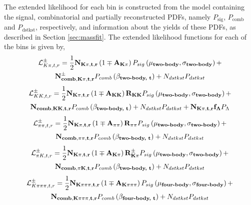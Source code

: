 The extended likelihood for each bin is constructed from the model containing the signal, combinatorial and partially reconstructed PDFs, namely $P_{\text{sig}}$, $P_{\text{comb}}$ and $P_{\text{dstkst}}$, respectively, and information about the yields of these PDFs, as described in Section \ref{sec:massfit}. The extended likelihood functions for each of the bins is given by,
\begin{multline}
\mathcal{L}_{K\pi, t, r}^{\pm} = \frac{1}{2}\mathbf{N_{K\pi, t, r}}\left(1 \mp \mathbf{A_{K\pi}}\right)P_{sig}\left(\mathbf{\mu_\text{\textbf{two-body}}},\mathbf{\sigma_\text{\textbf{two-body}}}\right) + \\ \mathbf{N_{comb, K\pi, t, r}^{\pm}}P_{comb}\left(\mathbf{\beta_\text{\textbf{two-body, t}}}\right) + N_{dstkst}P_{dstkst}
\label{kpilikelihood}
\end{multline}
\begin{multline}
\mathcal{L}_{KK, t, r}^{\pm} = \frac{1}{2}\mathbf{N_{K\pi, t, r}}\left(1 \mp \mathbf{A_{KK}}\right)\mathbf{R_{KK}} P_{sig}\left(\mathbf{\mu_\text{\textbf{two-body}}},\mathbf{\sigma_\text{\textbf{two-body}}}\right) + \\ \mathbf{N_{comb, KK, t, r}}P_{comb}\left(\mathbf{\beta_\text{\textbf{two-body, t}}}\right) + N_{dstkst}P_{dstkst} + \mathbf{N_{K\pi, t, r}}\mathbf{f_{\Lambda}}P_{\Lambda}
\end{multline}
\begin{multline}
\mathcal{L}_{\pi\pi, t, r}^{\pm} = \frac{1}{2}\mathbf{N_{K\pi, t, r}}\left(1 \mp \mathbf{A_{\pi\pi}}\right)\mathbf{R_{\pi\pi}} P_{sig}\left(\mathbf{\mu_\text{\textbf{two-body}}},\mathbf{\sigma_\text{\textbf{two-body}}}\right) + \\ \mathbf{N_{comb, \pi\pi, t, r}}P_{comb}\left(\mathbf{\beta_\text{\textbf{two-body, t}}}\right) + N_{dstkst}P_{dstkst}
\end{multline}
\begin{multline}
\mathcal{L}_{\pi K, t, r}^{\pm} = \frac{1}{2}\mathbf{N_{K\pi, t, r}}\left(1 \mp \mathbf{A_{K\pi}}\right)\mathbf{R_{K\pi}^{\pm}} P_{sig}\left(\mathbf{\mu_\text{\textbf{two-body}}},\mathbf{\sigma_\text{\textbf{two-body}}}\right) + \\ \mathbf{N_{comb, \pi K, t, r}}P_{comb}\left(\mathbf{\beta_\text{\textbf{two-body, t}}}\right) + N_{dstkst}P_{dstkst}
\end{multline}
\begin{multline}
\mathcal{L}_{K\pi\pi\pi, t, r}^{\pm} = \frac{1}{2}\mathbf{N_{K\pi\pi\pi, t, r}}\left(1 \mp \mathbf{A_{K\pi\pi\pi}}\right)P_{sig}\left(\mathbf{\mu_\text{\textbf{four-body}}},\mathbf{\sigma_\text{\textbf{four-body}}}\right) + \\ \mathbf{N_{comb, K\pi\pi\pi, t, r}}P_{comb}\left(\mathbf{\beta_\text{\textbf{four-body, t}}}\right) + N_{dstkst}P_{dstkst}
\end{multline}
